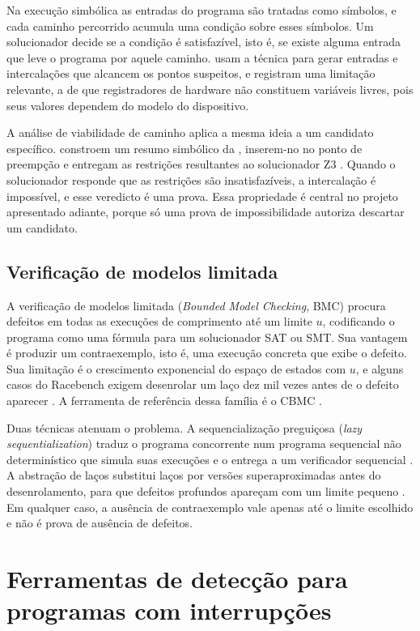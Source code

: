 Na execução simbólica as entradas do programa são tratadas como símbolos, e
cada caminho percorrido acumula uma condição sobre esses símbolos. Um
solucionador decide se a condição é satisfazível, isto é, se existe alguma
entrada que leve o programa por aquele caminho.  usam a
técnica para gerar entradas e intercalações que alcancem os pontos suspeitos, e
registram uma limitação relevante, a de que registradores de hardware não
constituem variáveis livres, pois seus valores dependem do modelo do
dispositivo.

A análise de viabilidade de caminho aplica a mesma ideia a um candidato
específico.  constroem um resumo simbólico da \isr,
inserem-no no ponto de preempção e entregam as restrições resultantes ao
solucionador Z3 \cite{z3}. Quando o solucionador responde que as restrições são
insatisfazíveis, a intercalação é impossível, e esse veredicto é uma prova.
Essa propriedade é central no projeto apresentado adiante, porque só uma prova de impossibilidade autoriza descartar um candidato.

\subsection{Verificação de modelos limitada}

A verificação de modelos limitada (\textit{Bounded Model Checking}, BMC)
procura defeitos em todas as execuções de comprimento até um limite $u$,
codificando o programa como uma fórmula para um solucionador SAT ou SMT. Sua
vantagem é produzir um contraexemplo, isto é, uma execução concreta que exibe o
defeito. Sua limitação é o crescimento exponencial do espaço de estados com
$u$, e alguns casos do Racebench exigem desenrolar um laço dez mil vezes antes
de o defeito aparecer \cite{nichecker}. A ferramenta de referência dessa
família é o CBMC \cite{cbmc}.

Duas técnicas atenuam o problema. A sequencialização preguiçosa (\textit{lazy
sequentialization}) traduz o programa concorrente num programa sequencial não
determinístico que simula suas execuções e o entrega a um verificador
sequencial \cite{lazycseq}. A abstração de laços substitui laços por versões
superaproximadas antes do desenrolamento, para que defeitos profundos apareçam
com um limite pequeno \cite{nichecker}. Em qualquer caso, a ausência de
contraexemplo vale apenas até o limite escolhido e não é prova de ausência de
defeitos.

\section{Ferramentas de detecção para programas com interrupções}
\label{sec:ferramentas}

